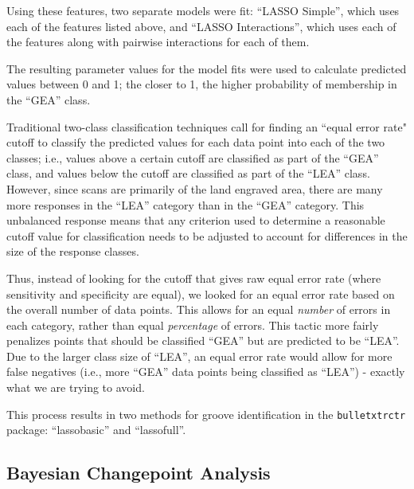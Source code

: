 \documentclass[12pt]{article}
\begin{document}
Using these features, two separate models were fit: ``LASSO Simple'',
which uses each of the features listed above, and ``LASSO
Interactions'', which uses each of the features along with pairwise
interactions for each of them.

The resulting parameter values for the model fits were used to calculate
predicted values between 0 and 1; the closer to 1, the higher
probability of membership in the ``GEA'' class.

Traditional two-class classification techniques call for finding an
``equal error rate" cutoff to classify the predicted values for each
data point into each of the two classes; i.e., values above a certain
cutoff are classified as part of the ``GEA'' class, and values below the
cutoff are classified as part of the ``LEA'' class. However, since scans
are primarily of the land engraved area, there are many more responses
in the ``LEA'' category than in the ``GEA'' category. This unbalanced
response means that any criterion used to determine a reasonable cutoff
value for classification needs to be adjusted to account for differences
in the size of the response classes.

Thus, instead of looking for the cutoff that gives raw equal error rate
(where sensitivity and specificity are equal), we looked for an equal
error rate based on the overall number of data points. This allows for
an equal \emph{number} of errors in each category, rather than equal
\emph{percentage} of errors. This tactic more fairly penalizes points
that should be classified ``GEA'' but are predicted to be ``LEA''. Due
to the larger class size of ``LEA'', an equal error rate would allow for
more false negatives (i.e., more ``GEA'' data points being classified as
``LEA'') - exactly what we are trying to avoid.

This process results in two methods for groove identification in the
\texttt{bulletxtrctr} package: ``lassobasic'' and ``lassofull''.

\subsection{Bayesian Changepoint Analysis}
\end{document}
